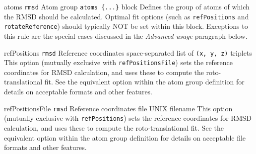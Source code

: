 \begin{cvcoptions}

\item %
  \key
    {atoms}{%
    \texttt{rmsd}}{%
    Atom group}{%
    \texttt{atoms~\{...\}} block}{%
    Defines the group of atoms of which the RMSD should be calculated.
    Optimal fit options (such as \texttt{refPositions} and
    \texttt{rotateReference}) should typically NOT be set within this
    block. Exceptions to this rule are the special cases discussed in
    the \emph{Advanced usage} paragraph below.
    }

\item %
  \key
    {refPositions}{%
    \texttt{rmsd}}{%
    Reference coordinates}{%
    space-separated list of \texttt{(x, y, z)} triplets}{%
    This option (mutually exclusive with \texttt{refPositionsFile}) sets the reference coordinates for RMSD calculation, and uses these to compute the roto-translational fit.  
    See the equivalent option  within the atom group definition for details on acceptable formats and other features.
    }

\item %
  \key
    {refPositionsFile}{%
    \texttt{rmsd}}{%
    Reference coordinates file}{%
    UNIX filename}{%
    This option (mutually exclusive with \texttt{refPositions}) sets the reference coordinates for RMSD calculation, and uses these to compute the roto-translational fit.  
    See the equivalent option  within the atom group definition for details on acceptable file formats and other features.
    }



\end{cvcoptions}

